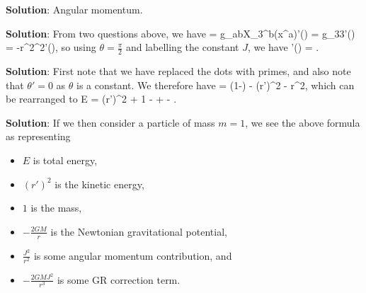 
\textbf{Solution}: Angular momentum. 

\textbf{Solution}: From two questions above, we have 
\bse 
     = g_{ab}X_3^b(x^a)'(\lambda) = g_{33}\varphi'(\lambda) = -r^2\sin^2\theta\varphi'(\lambda),
\ese
so using $\theta=\frac{\pi}{2}$ and labelling the constant $J$, we have 
\bse 
    \varphi'(\lambda) = .
\ese 


\textbf{Solution}: First note that we have replaced the dots with primes, and also note that $\theta'=0$ as $\theta$ is a constant. We therefore have 
 = \bigg(1-\bigg) - (r')^2 - r^2,
\ese 
which can be rearranged to 
\bse 
    E = (r')^2 + 1 -  +  - .
\ese 

\textbf{Solution}: If we then consider a particle of mass $m=1$, we see the above formula as representing 
\begin{itemize}
    \item $E$ is total energy, 
    \item $(r')^2$ is the kinetic energy, 
    \item $1$ is the mass, 
    \item $-\frac{2GM}{r}$ is the Newtonian gravitational potential, 
    \item $\frac{J^2}{r^2}$ is some angular momentum contribution, and 
    \item $-\frac{2GMJ^2}{r^3}$ is some GR correction term. 
\end{itemize}

